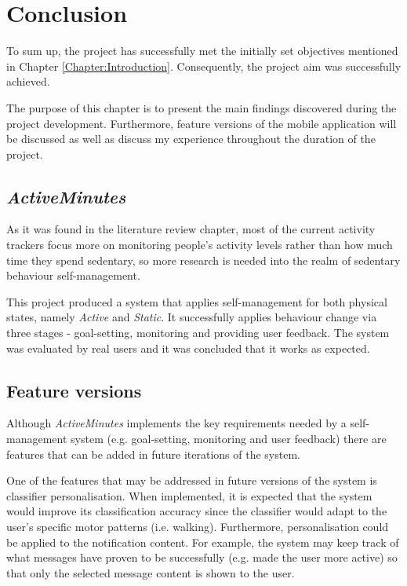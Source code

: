 \chapter{Conclusion}
To sum up, the project has successfully met the initially set objectives mentioned in Chapter \ref{Chapter:Introduction}. Consequently, the project aim was successfully achieved. 

The purpose of this chapter is to present the main findings discovered during the project development. Furthermore, feature versions of the mobile application will be discussed as well as discuss my experience throughout the duration of the project. 

\section{\textit{ActiveMinutes}}
As it was found in the literature review chapter, most of the current activity trackers focus more on monitoring people's activity levels rather than how much time they spend sedentary, so more research is needed into the realm of sedentary behaviour self-management.

This project produced a system that applies self-management for both physical states, namely \textit{Active} and \textit{Static}. It successfully applies behaviour change via three stages - goal-setting, monitoring and providing user feedback. The system was evaluated by real users and it was concluded that it works as expected.

\section{Feature versions}
Although \textit{ActiveMinutes} implements the key requirements needed by a self-management system (e.g. goal-setting, monitoring and user feedback) there are features that can be added in future iterations of the system. 

One of the features that may be addressed in future versions of the system is classifier personalisation. When implemented, it is expected that the system would improve its classification accuracy since the classifier would adapt to the user's specific motor patterns (i.e. walking). Furthermore, personalisation could be applied to the notification content. For example, the system may keep track of what messages have proven to be successfully (e.g. made the user more active) so that only the selected message content is shown to the user.

